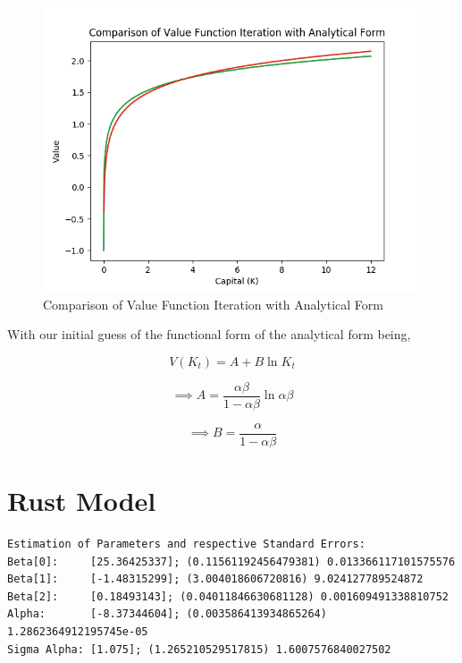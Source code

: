 \documentclass{article}
\begin{document}
\begin{figure}[h]
\begin{center}
\includegraphics[width=\textwidth]{Figure3.png}
\caption{Comparison of Value Function Iteration with Analytical Form}
\end{center}
\end{figure}
\FloatBarrier

With our initial guess of the functional form of the analytical form being,

\begin{equation}
V(K_t) = A + B \ln K_t
\end{equation}

\begin{equation}
\implies A = \frac{\alpha \beta}{1- \alpha \beta} \ln \alpha \beta
\end{equation}

\begin{equation}
\implies B=\frac{\alpha}{1-\alpha\beta}
\end{equation}

\newpage

\section{Rust Model}

\begin{lstlisting}
Estimation of Parameters and respective Standard Errors:
Beta[0]:     [25.36425337]; (0.11561192456479381) 0.013366117101575576
Beta[1]:     [-1.48315299]; (3.004018606720816) 9.024127789524872
Beta[2]:     [0.18493143]; (0.04011846630681128) 0.001609491338810752
Alpha:       [-8.37344604]; (0.003586413934865264) 1.2862364912195745e-05
Sigma Alpha: [1.075]; (1.265210529517815) 1.6007576840027502
\end{lstlisting}
\end{document}
